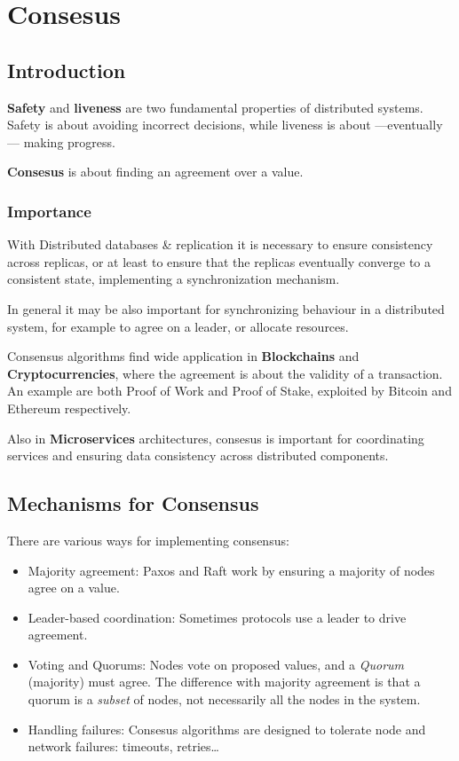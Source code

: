 \chapter{Consesus}

\section{Introduction}
\textbf{Safety} and \textbf{liveness} are two fundamental properties of distributed systems.
Safety is about avoiding incorrect decisions, while liveness is about ---eventually--- making progress.

\textbf{Consesus} is about finding an agreement over a value.

\subsection{Importance}
With Distributed databases \& replication it is necessary to ensure consistency across replicas, or at least to ensure that the replicas eventually converge to a consistent state, implementing a synchronization mechanism.


In general it may be also important for synchronizing behaviour in a distributed system, for example to agree on a leader, or allocate resources.
\nl

Consensus algorithms find wide application in \textbf{Blockchains} and \textbf{Cryptocurrencies}, where the agreement is about the validity of a transaction. An example are both Proof of Work and Proof of Stake, exploited by Bitcoin and Ethereum respectively.

Also in \textbf{Microservices} architectures, consesus is important for coordinating services and ensuring data consistency across distributed components.

\section{Mechanisms for Consensus}
{\ns
There are various ways for implementing consensus:
\begin{itemize}
   \item Majority agreement:
   Paxos and Raft work by ensuring a majority of nodes agree on a value.
   \item Leader-based coordination:
   Sometimes protocols use a leader to drive agreement.
   \item Voting and Quorums:
   Nodes vote on proposed values, and a \textit{Quorum} (majority) must agree.
   The difference with majority agreement is that a quorum is a \textit{subset} of nodes, not necessarily all the nodes in the system. 
   \item Handling failures:
   Consesus algorithms are designed to tolerate node and network failures: timeouts, retries\dots
\end{itemize}}

